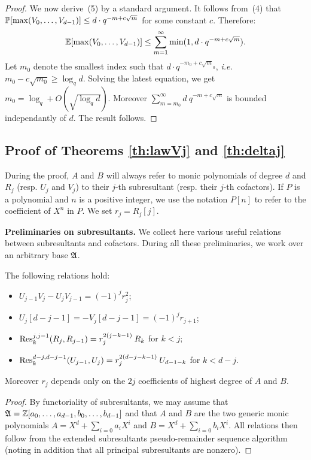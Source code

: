 \documentclass{article}
\begin{document}
\begin{proof}
We now derive~(5) by a standard argument. It follows from~(4) that
$\P[\max(V_0, \ldots, V_{d-1})] \leq d \cdot q^{-m + c\sqrt m}$
for some constant $c$. Therefore:
$$\E[\max(V_0, \ldots, V_{d-1})] \leq \sum_{m=1}^\infty \min(1,
d \cdot q^{-m + c\sqrt m}).$$
Let $m_0$ denote the smallest index such that $d \cdot q^{-m_0 + c\sqrt 
m_0}$, \emph{i.e.} $m_0 - c \sqrt{m_0} \geq \log_q d$. Solving the latest
equation, we get $m_0 = \log_q + O(\sqrt{\log_q d})$. Moreover
$\sum_{m=m_0}^\infty d\: q^{-m + c\sqrt m}$ is bounded independantly of
$d$. The result follows.
\end{proof}

\subsection{Proof of Theorems \ref{th:lawVj} and \ref{th:deltaj}}
\label{subsec:proof}

During the proof, $A$ and $B$ will always refer to monic polynomials of 
degree $d$ and $R_j$ (resp. $U_j$ and $V_j$) to their $j$-th 
subresultant (resp. their $j$-th cofactors). If $P$ is a polynomial and 
$n$ is a positive integer, we use the notation $P[n]$ to refer to the 
coefficient of $X^n$ in $P$. We set $r_j = R_j[j]$.

\medskip

\noindent
\textbf{Preliminaries on subresultants.}
We collect here various useful relations between subresultants and 
cofactors. During all these preliminaries, we work over an arbitrary
base $\ring$.

\begin{prop}
\label{prop:relations}
The following relations hold:
\begin{itemize}
\setlength\itemsep{0.1em}
\item $U_{j-1} V_j - U_j V_{j-1} = (-1)^j r_j^2$;
\item $U_j[d{-}j{-}1] = -V_j[d{-}j{-}1] = (-1)^j r_{j+1}$;
\item $\Res^{j,j-1}_k(R_j, R_{j-1}) = r_j^{2(j-k-1)} \: R_k$ for $k < j$;
\item $\Res^{d-j,d-j-1}_k(U_{j-1}, U_j) = r_j^{2(d-j-k-1)} \: U_{d-1-k}$
for $k < d-j$.
\end{itemize}
Moreover $r_j$ depends only on the $2j$ coefficients of highest 
degree of $A$ and $B$.
\end{prop}

\begin{proof}
By functoriality of subresultants, we may assume that $\ring = 
\Z[a_0, \ldots, a_{d-1}, b_0, \ldots, b_{d-1}]$ and that $A$ and $B$
are the two generic monic polynomials 
$A = X^d + \sum_{i=0} a_i X^i$ and
$B = X^d + \sum_{i=0} b_i X^i$.
All relations then follow from the extended subresultants 
pseudo-remainder sequence algorithm (noting in addition that all
principal subresultants are nonzero). 
\end{proof}
\end{document}
